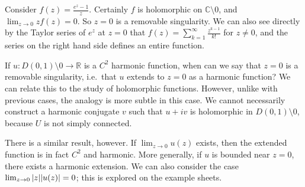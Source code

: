 \begin{example}
	Consider \( f(z) = \frac{e^z - 1}{z} \).
	Certainly \( f \) is holomorphic on \( \mathbb C \setminus \qty{0} \), and \( \lim_{z \to 0} zf(z) = 0 \).
	So \( z = 0 \) is a removable singularity.
	We can also see directly by the Taylor series of \( e^z \) at \( z = 0 \) that \( f(z) = \sum_{k=1}^\infty \frac{z^{k-1}}{k!} \) for \( z \neq 0 \), and the series on the right hand side defines an entire function.
\end{example}
\begin{remark}
	If \( u \colon D(0,1) \setminus \qty{0} \to \mathbb R \) is a \( C^2 \) harmonic function, when can we say that \( z = 0 \) is a removable singularity, i.e.\ that \( u \) extends to \( z = 0 \) as a harmonic function?
	We can relate this to the study of holomorphic functions.
	However, unlike with previous cases, the analogy is more subtle in this case.
	We cannot necessarily construct a harmonic conjugate \( v \) such that \( u + iv \) is holomorphic in \( D(0,1) \setminus\qty{0} \), because \( U \) is not simply connected.

	There is a similar result, however.
	If \( \lim_{z \to 0} u(z) \) exists, then the extended function is in fact \( C^2 \) and harmonic.
	More generally, if \( u \) is bounded near \( z = 0 \), there exists a harmonic extension.
	We can also consider the case \( \lim_{z \to 0} \abs{z} \abs{u(z)} = 0 \); this is explored on the example sheets.
\end{remark}

